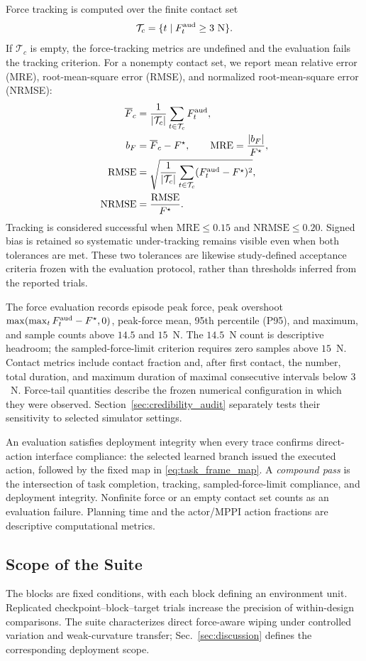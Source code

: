 Force tracking is computed over the finite contact set
\begin{equation}
\mathcal{T}_{c}=\{t\mid F^{\mathrm{aud}}_t\geq3~\mathrm{N}\}.
\end{equation}
If $\mathcal{T}_{c}$ is empty, the force-tracking metrics are undefined and
the evaluation fails the tracking criterion. For a nonempty contact set, we
report mean relative error (MRE), root-mean-square error (RMSE), and normalized
root-mean-square error (NRMSE):
\begin{align}
\overline F_c
&=\frac{1}{|\mathcal{T}_{c}|}
\sum_{t\in\mathcal{T}_{c}}F^{\mathrm{aud}}_t,\nonumber\\
b_F&=\overline F_c-F^{\star},\qquad
\mathrm{MRE}=\frac{|b_F|}{F^{\star}},\nonumber\\
\mathrm{RMSE}
&=\sqrt{\frac{1}{|\mathcal{T}_{c}|}
\sum_{t\in\mathcal{T}_{c}}(F^{\mathrm{aud}}_t-F^{\star})^2},\nonumber\\
\mathrm{NRMSE}&=\frac{\mathrm{RMSE}}{F^{\star}}.
\label{eq:force_metrics}
\end{align}
Tracking is considered successful when
$\mathrm{MRE}\leq0.15$ and $\mathrm{NRMSE}\leq0.20$. Signed bias is
retained so systematic under-tracking remains visible even when both
tolerances are met. These two tolerances are likewise study-defined acceptance
criteria frozen with the evaluation protocol, rather than thresholds inferred
from the reported trials.

The force evaluation records episode peak force, peak overshoot
$\max(\max_tF^{\mathrm{aud}}_t-F^{\star},0)$, peak-force mean, 95th percentile (P95), and
maximum, and sample counts
above $14.5$ and $15$~N. The $14.5$~N count is descriptive headroom; the
sampled-force-limit criterion requires zero samples above $15$~N. Contact metrics
include contact fraction and, after first contact, the number, total duration,
and maximum duration of maximal consecutive intervals below $3$~N.
Force-tail quantities describe the frozen numerical configuration in which
they were observed. Section~\ref{sec:credibility_audit} separately tests their
sensitivity to selected simulator settings.

An evaluation satisfies deployment integrity when every trace confirms
direct-action interface compliance: the selected learned branch issued the
executed action, followed by the fixed map in \eqref{eq:task_frame_map}. A
\emph{compound pass} is the intersection of task completion, tracking,
sampled-force-limit compliance, and deployment integrity. Nonfinite force or
an empty contact set counts as an evaluation failure. Planning time and the
actor/MPPI action fractions are descriptive computational metrics.

\subsection{Scope of the Suite}
\label{subsec:scope}

The blocks are fixed conditions, with each block defining an
environment unit. Replicated checkpoint--block--target trials increase the
precision of within-design comparisons. The suite characterizes direct
force-aware wiping under controlled variation and weak-curvature transfer;
Sec.~\ref{sec:discussion} defines the corresponding deployment scope.
